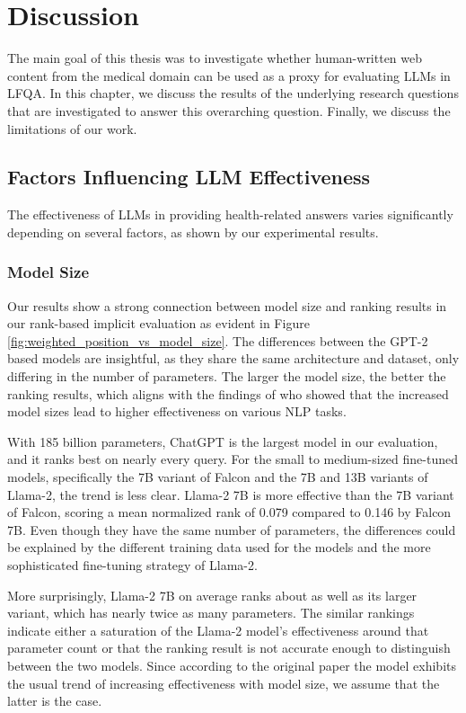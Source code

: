
\chapter{Discussion}\label{discussion}

The main goal of this thesis was to investigate whether human-written web content from the medical domain can be used as a proxy for evaluating LLMs in LFQA.
In this chapter, we discuss the results of the underlying research questions that are investigated to answer this overarching question.
Finally, we discuss the limitations of our work.

\section{Factors Influencing LLM Effectiveness}

The effectiveness of LLMs in providing health-related answers varies significantly depending on several factors, as shown by our experimental results.

\subsection{Model Size}
Our results show a strong connection between model size and ranking results in our rank-based implicit evaluation as evident in Figure \ref{fig:weighted_position_vs_model_size}. 
The differences between the GPT-2 based models are insightful, as they share the same architecture and dataset, only differing in the number of parameters.
The larger the model size, the better the ranking results, which aligns with the findings of \cite{radford:2019:language} who showed that the increased model sizes lead to higher effectiveness on various NLP tasks.

With 185 billion parameters, ChatGPT is the largest model in our evaluation, and it ranks best on nearly every query.
For the small to medium-sized fine-tuned models, specifically the 7B variant of Falcon and the 7B and 13B variants of Llama-2, the trend is less clear.
Llama-2 7B is more effective than the 7B variant of Falcon, scoring a mean normalized rank of 0.079 compared to 0.146 by Falcon 7B.
Even though they have the same number of parameters, the differences could be explained by the different training data used for the models and the more sophisticated fine-tuning strategy of Llama-2.

More surprisingly, Llama-2 7B on average ranks about as well as its larger variant, which has nearly twice as many parameters.
The similar rankings indicate either a saturation of the Llama-2 model's effectiveness around that parameter count or that the ranking result is not accurate enough to distinguish between the two models.
Since according to the original paper \cite{touvron:2023:Llama} the model exhibits the usual trend of increasing effectiveness with model size, we assume that the latter is the case.

